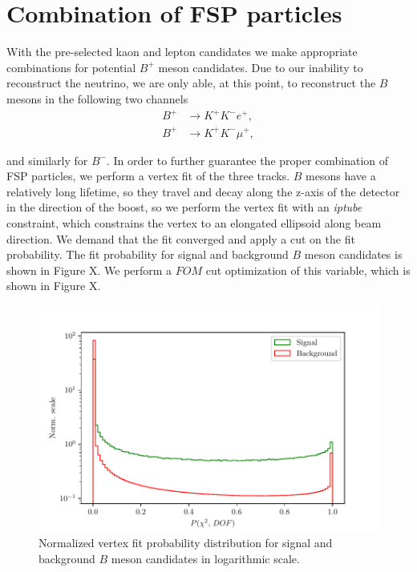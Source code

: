 \documentclass[oneside,a4paper,openany,12pt]{scrbook}
\begin{document}
\section{Combination of FSP particles}

With the pre-selected kaon and lepton candidates we make appropriate combinations for potential $B^+$ meson candidates. Due to our inability to reconstruct the neutrino, we are only able, at this point, to reconstruct the $B$ mesons in the following two channels
\begin{align*}
B^+ &\to K^+ K^- e^+, \\
B^+ &\to K^+ K^- \mu^+,
\end{align*}

and similarly for $B^-$. In order to further guarantee the proper combination of FSP particles, we perform a vertex fit of the three tracks. $B$ mesons have a relatively long lifetime, so they travel and decay along the z-axis of the detector in the direction of the boost, so we perform the vertex fit with an \textit{iptube} constraint, which constrains the vertex to an elongated ellipsoid along beam direction. We demand that the fit converged and apply a cut on the fit probability. The fit probability for signal and background $B$ meson candidates is shown in Figure X. We perform a $FOM$ cut optimization of this variable, which is shown in Figure X.

\begin{figure}[H]
\centering
\captionsetup{width=.7\linewidth}
\includegraphics[scale=0.6]{fig/VTX_var}
\caption{Normalized vertex fit probability distribution for signal and background $B$ meson candidates in logarithmic scale.}
\label{fig:vtxvar}
\end{figure}
\end{document}
